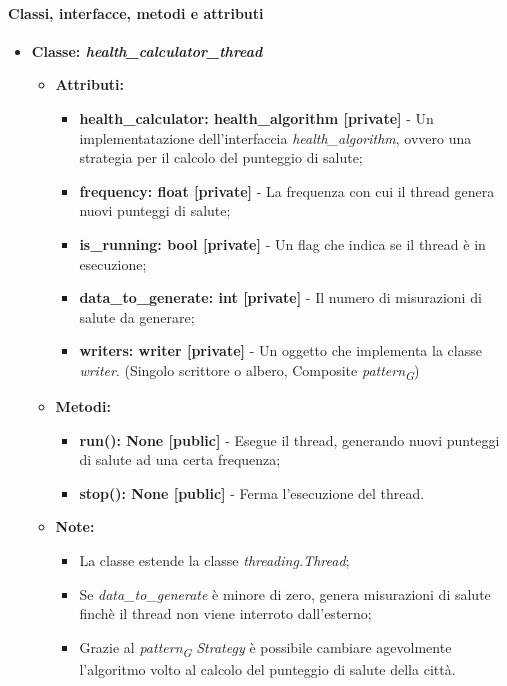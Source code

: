 \paragraph*{Classi, interfacce, metodi e attributi}
\begin{itemize}
    \item{\textbf{Classe: \textit{health\_calculator\_thread}}}
    \begin{itemize}
        \item\textbf{Attributi:}
        \begin{itemize}
            \item \textbf{health\_calculator: health\_algorithm [private]} - Un implementatazione dell'interfaccia \textit{health\_algorithm}, ovvero una strategia per il calcolo del punteggio di salute;
            \item \textbf{frequency: float [private]} - La frequenza con cui il thread genera nuovi punteggi di salute;
            \item \textbf{is\_running: bool [private]} - Un flag che indica se il thread è in esecuzione;
            \item \textbf{data\_to\_generate: int [private]} - Il numero di misurazioni di salute da generare;
            \item \textbf{writers: writer [private]} - Un oggetto che implementa la classe \textit{writer}. (Singolo scrittore o albero, Composite \textit{pattern}\textsubscript{\textit{G}})
        \end{itemize}
        \item \textbf{Metodi: }
        \begin{itemize}
            \item \textbf{run(): None [public]} - Esegue il thread, generando nuovi punteggi di salute ad una certa frequenza;
            \item \textbf{stop(): None [public]} - Ferma l'esecuzione del thread.
        \end{itemize}
        \item\textbf{Note:}
        \begin{itemize}
            \item La classe estende la classe \textit{threading.Thread};
            \item Se \textit{data\_to\_generate} è minore di zero, genera misurazioni di salute finchè il thread non viene interroto dall'esterno;
            \item   Grazie al \textit{pattern}\textsubscript{\textit{G}} \textit{Strategy} è possibile cambiare agevolmente l'algoritmo volto al calcolo del punteggio di salute della città.

\end{itemize}
\end{itemize}
\end{itemize}
